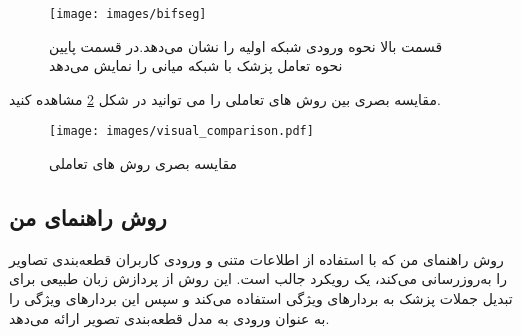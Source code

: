 \begin{figure}[h]
\centerline{\texttt{[image: images/bifseg]}}
\caption[\hspace{0.5em}ساختار ]{قسمت بالا نحوه ورودی شبکه اولیه را نشان می‌دهد.در قسمت پایین نحوه تعامل پزشک با شبکه میانی را نمایش می‌دهد\cite{malhotra2022deep}}
\label{fig:bifseg}
\end{figure}
مقایسه بصری بین روش های تعاملی را می توانید در شکل \ref{fig:visual_comparison} مشاهده کنید.
\begin{figure}[h]
\centerline{\texttt{[image: images/visual\_comparison.pdf]}}
\caption[\hspace{0.5em}مقایسه بصری روش های تعاملی]{مقایسه بصری روش های تعاملی \cite{wang2018interactive}}
\label{fig:visual_comparison}
\end{figure}




\subsection{ روش راهنمای من}
روش  راهنمای من \cite{wang2022medical}  که با استفاده از اطلاعات متنی و ورودی کاربران قطعه‌بندی تصاویر را به‌روزرسانی می‌کند، یک رویکرد جالب است. این روش از پردازش زبان طبیعی برای تبدیل جملات پزشک به بردارهای ویژگی استفاده می‌کند و سپس این بردارهای ویژگی را به عنوان ورودی به مدل قطعه‌بندی تصویر ارائه می‌دهد.

